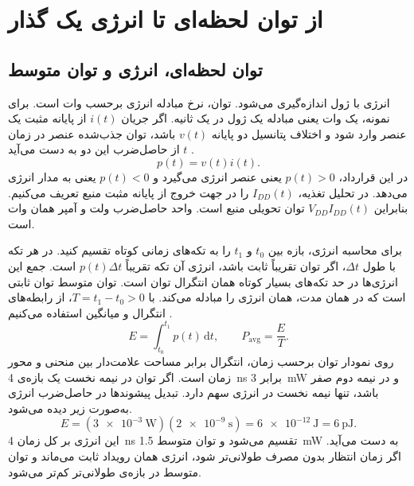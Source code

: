 \section{از توان لحظه‌ای تا انرژی یک گذار}
\label{sec:power-energy}

\subsection{توان لحظه‌ای، انرژی و توان متوسط}
\label{sec:power-average}

انرژی با ژول اندازه‌گیری می‌شود. توان، نرخ مبادله انرژی برحسب وات است.
برای نمونه، یک وات یعنی مبادله یک ژول در یک ثانیه. اگر جریان
\(i(t)\) از پایانه مثبت یک عنصر وارد شود و اختلاف پتانسیل دو پایانه
\(v(t)\) باشد، توان جذب‌شده عنصر در زمان \(t\) از حاصل‌ضرب این دو
به دست می‌آید \cite[بخش ، صفحه ۱۸۲]{weste}.
\begin{equation}
  p(t)=v(t)i(t).
  \label{eq:power-instantaneous}
\end{equation}
در این قرارداد، \(p(t)>0\) یعنی عنصر انرژی می‌گیرد و \(p(t)<0\)
یعنی به مدار انرژی می‌دهد. در تحلیل تغذیه، \(I_{DD}(t)\) را در جهت
خروج از پایانه مثبت منبع تعریف می‌کنیم. بنابراین \(V_{DD}I_{DD}(t)\)
توان تحویلی منبع است. واحد حاصل‌ضرب ولت و آمپر همان وات است.

برای محاسبه انرژی، بازه بین \(t_0\) و \(t_1\) را به تکه‌های زمانی
کوتاه تقسیم کنید. در هر تکه با طول \(\Delta t\)، اگر توان تقریباً
ثابت باشد، انرژی آن تکه تقریباً \(p(t)\Delta t\) است. جمع این
انرژی‌ها در حد تکه‌های بسیار کوتاه همان انتگرال توان است. توان متوسط
توان ثابتی است که در همان مدت، همان انرژی را مبادله می‌کند.
با \(T=t_1-t_0>0\)، از رابطه‌های انتگرال و میانگین استفاده می‌کنیم
\cite[صفحه ۱۸۲]{weste}.
\begin{equation}
  E=\int_{t_0}^{t_1}p(t)\,\mathrm{d}t,
  \qquad
  P_{\mathrm{avg}}=\frac{E}{T}.
  \label{eq:power-interval}
\end{equation}
روی نمودار توان برحسب زمان، انتگرال برابر مساحت علامت‌دار بین منحنی
و محور زمان است. اگر توان در نیمه نخست یک بازه‌ی
\qty{4}{\nano\second} برابر \qty{3}{\milli\watt} و در نیمه دوم
صفر باشد، تنها نیمه نخست در انرژی سهم دارد. تبدیل پیشوندها در حاصل‌ضرب
انرژی به‌صورت زیر دیده می‌شود.
\[
  E=(\qty{3e-3}{\watt})(\qty{2e-9}{\second})
    =\qty{6e-12}{\joule}
    =\qty{6}{\pico\joule}.
\]
این انرژی بر کل زمان \qty{4}{\nano\second} تقسیم می‌شود و توان
متوسط \qty{1.5}{\milli\watt} به دست می‌آید. اگر زمان انتظار بدون
مصرف طولانی‌تر شود، انرژی همان رویداد ثابت می‌ماند و توان متوسط در
بازه‌ی طولانی‌تر کم‌تر می‌شود.

